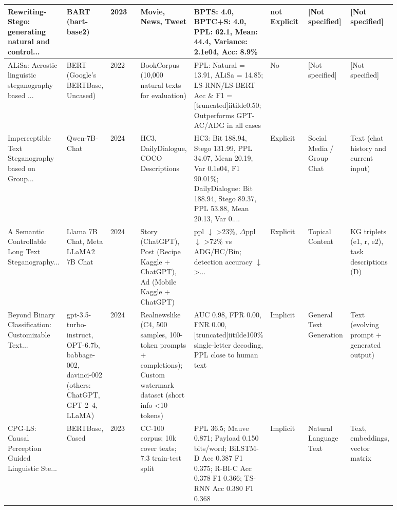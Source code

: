 \begin{longtable}{|p{0.11\linewidth}|p{0.11\linewidth}|p{0.11\linewidth}|p{0.11\linewidth}|p{0.11\linewidth}|p{0.11\linewidth}|p{0.11\linewidth}|p{0.11\linewidth}|}
Rewriting-Stego: generating natural and control... \cite{li2023rewriting} & BART (bart-base2) & 2023 & Movie, News, Tweet & BPTS: 4.0, BPTC+S: 4.0, PPL: 62.1, Mean: 44.4, Variance: 2.1e04, Acc: 8.9\% & not Explicit & [Not specified] & [Not specified] \\
\hline

ALiSa: Acrostic linguistic steganography based ... \cite{yi2022alisa} & BERT (Google's BERTBase, Uncased) & 2022 & BookCorpus (10,000 natural texts for evaluation) & PPL: Natural = 13.91, ALiSa = 14.85; LS-RNN/LS-BERT Acc \& F1 = [truncated]iitilde{}0.50; Outperforms GPT-AC/ADG in all cases & No & [Not specified] & [Not specified] \\
\hline

Imperceptible Text Steganography based on Group... \cite{li2024imperceptible} & Qwen-7B-Chat & 2024 & HC3, DailyDialogue, COCO Descriptions & HC3: Bit 188.94, Stego 131.99, PPL 34.07, Mean 20.19, Var 0.1e04, F1 90.01\%; DailyDialogue: Bit 188.94, Stego 89.37, PPL 53.88, Mean 20.13, Var 0.... & Explicit & Social Media / Group Chat & Text (chat history and current input) \\
\hline

A Semantic Controllable Long Text Steganography... \cite{li2024semantic} & Llama 7B Chat, Meta LLaMA2 7B Chat & 2024 & Story (ChatGPT), Post (Recipe Kaggle + ChatGPT), Ad (Mobile Kaggle + ChatGPT) & ppl \ensuremath{\downarrow} >23\%, \ensuremath{\Delta}ppl \ensuremath{\downarrow} >72\% vs ADG/HC/Bin; detection accuracy \ensuremath{\downarrow} >... & Explicit & Topical Content & KG triplets (e1, r, e2), task descriptions (D) \\
\hline

Beyond Binary Classification: Customizable Text... \cite{10650062} & gpt-3.5-turbo-instruct, OPT-6.7b, babbage-002, davinci-002 (others: ChatGPT, GPT-2--4, LLaMA) & 2024 & Realnewslike (C4, 500 samples, 100-token prompts + completions); Custom watermark dataset (short info <10 tokens) & AUC 0.98, FPR 0.00, FNR 0.00, [truncated]iitilde{}100\% single-letter decoding, PPL close to human text & Implicit & General Text Generation & Text (evolving prompt + generated output) \\
\hline

CPG-LS: Causal Perception Guided Linguistic Ste... \cite{xiang2023cpg} & BERTBase, Cased & 2023 & CC-100 corpus; 10k cover texts; 7:3 train-test split & PPL 36.5; Mauve 0.871; Payload 0.150 bits/word; BiLSTM-D Acc 0.387 F1 0.375; R-BI-C Acc 0.378 F1 0.366; TS-RNN Acc 0.380 F1 0.368 & Implicit & Natural Language Text & Text, embeddings, vector matrix \\
\hline


\end{longtable}
